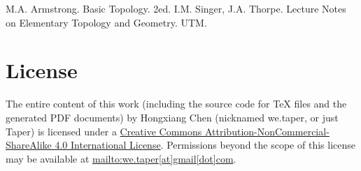 \documentclass{article}
\begin{document}
\begin{thebibliography}{1}
     M.A. Armstrong. Basic Topology. 2ed.
     I.M. Singer, J.A. Thorpe. Lecture Notes on
    Elementary Topology and Geometry. UTM.
\end{thebibliography}
\printnomenclature
\section{License}
The entire content of this work (including the source code
for TeX files and the generated PDF documents) by 
Hongxiang Chen (nicknamed we.taper, or just Taper) is
licensed under a 
\href{http://creativecommons.org/licenses/by-nc-sa/4.0/}{Creative 
Commons Attribution-NonCommercial-ShareAlike 4.0 International 
License}. Permissions beyond the scope of this 
license may be available at \url{mailto:we.taper[at]gmail[dot]com}.
\end{document}
